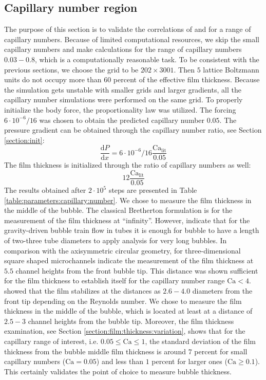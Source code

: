 \documentclass[preprint,12pt]{elsarticle}
\newcommand{\Ca}{\mathrm{Ca}}
\begin{document}
\subsection{Capillary number region}
\label{section:capillary:range}
The purpose of this section is to validate the correlations of
\citet{giavedoni-numerical} %
and
\citet{heil-bretherton} %
for a range of capillary
numbers. Because of limited computational resources, we skip the
small capillary numbers and make calculations for the range of capillary numbers $0.03-0.8$, which
is a computationally reasonable task.  To be consistent with the previous sections, we choose the grid to be
$202 \times 3001$. Then $5$ lattice Boltzmann units do not occupy more than $60$
percent of the effective film thickness. Because the simulation gets unstable with
smaller grids and larger gradients, all the capillary number simulations were
performed on the same grid. To properly initialize the body force, the
proportionality law was utilized. The forcing
$6 \cdot 10^{-6}/16$ was chosen to obtain the predicted capillary
number $0.05$.  
The pressure gradient can be obtained through the capillary number
ratio, see Section \ref{section:init}:
\begin{equation}
\frac{\mathrm{d}P}{\mathrm{d} x}=6 \cdot 10^{-6}/16 \frac{\Ca_{\mathrm{lit}}}{0.05}
\end{equation}
The film thickness is initialized through the ratio of capillary numbers as well:
\begin{equation*}
12 \frac{\Ca_{\mathrm{lit}}}{0.05}
\end{equation*}
The results obtained after $2\cdot10^5$ steps are presented in Table
\ref{table:parameters:capillary:number}. 
{\color{red} We chose to measure the film thickness in the middle of the bubble. The
classical Bretherton formulation is for the measurement of the film thickness at ``infinity''.
However, \citet{cerro-bubble-train} indicate that for the gravity-driven bubble train flow in tubes
it is enough for bubble to have a length of two-three tube diameters to apply analysis for very long
bubbles. In comparison with the axisymmetric circular geometry, for three-dimensional square shaped
microchannels \citet{heil-threedim} indicate the measurement of the film thickness at $5.5$
channel heights from the front bubble tip. This distance was shown sufficient for the
film thickness to establish itself for the capillary number range $\Ca<4$.
\citet{giavedoni-numerical} showed that the film stabilizes at the distances as $2.6-4.0$ diameters
from the front tip depending on the Reynolds number.  We chose to measure the film thickness in the
middle of the bubble, which is located at least at a distance of $2.5-3$ channel heights from the 
bubble tip. Moreover, the film thickness examination, see Section
\ref{section:film:thickness:variation}, shows that for the capillary range of interest, i.e.
$0.05\leq \Ca \leq 1$, the standard deviation of the film thickness from the bubble middle film
thickness is around $7$
percent for small capillary numbers ($\Ca=0.05$) and less than $1$ percent for larger ones ($\Ca
\geq 0.1$). %
This certainly validates the point of choice to measure bubble thickness.}
\end{document}
